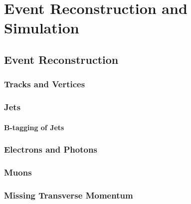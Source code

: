 \chapter{Event Reconstruction and Simulation}
\label{chap:event}

\section{Event Reconstruction}
\label{sec:event:reco}

\subsection{Tracks and Vertices}


\subsection{Jets}

\subsubsection{B-tagging of Jets}

\subsection{Electrons and Photons}

\subsection{Muons}

\subsection{Missing Transverse Momentum}
